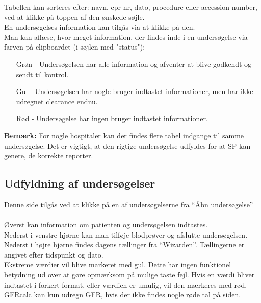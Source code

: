 \documentclass{article}
\begin{document}
Tabellen kan sorteres efter: navn, cpr-nr, dato, procedure eller accession number, ved at klikke på toppen af den ønskede søjle. \\

En undersøgelses information kan tilgås via at klikke på den. \\

Man kan aflæse, hvor meget information, der findes inde i en undersøgelse via farven på clipboardet (i søjlen med "status"):
\begin{itemize}
	\item[Grøn] - Undersøgelsen har alle information og afventer at blive godkendt og sendt til kontrol.
	\item[Gul] - Undersøgelsen har nogle bruger indtastet informationer, men har ikke udregnet clearance endnu.
	\item[Rød] - Undersøgelse har ingen bruger indtastet informationer.
\end{itemize}
\textbf{Bemærk:} For nogle hospitaler kan der findes flere tabel indgange til samme undersøgelse. Det er vigtigt, at den rigtige undersøgelse udfyldes for at  SP kan genere, de korrekte reporter.

\subsection{Udfyldning af undersøgelser}\label{fill_study}
Denne side tilgås ved at klikke på en af undersøgelserne fra “Åbn undersøgelse”\\\\
Øverst kan information om patienten og undersøgelsen indtastes. \\
Nederst i venstre hjørne kan man tilføje blodprøver og afslutte undersøgelsen. \\ 
Nederst i højre hjørne findes dagens tællinger fra “Wizarden”. Tællingerne er angivet efter tidspunkt og dato.  \\

Ekstreme værdier vil blive markeret med gul. Dette har ingen funktionel betydning ud over at gøre opmærksom på mulige taste fejl. Hvis en værdi  bliver indtastet i forkert format, eller værdien er umulig, vil den mærkeres med rød. GFRcalc kan kun udregn GFR, hvis der ikke findes nogle røde tal på siden. \\
\end{document}

